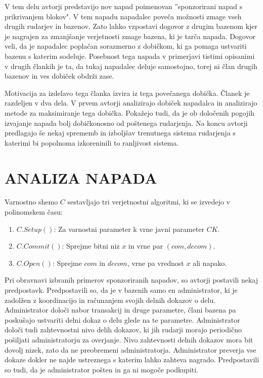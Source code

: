 \documentclass{acm_proc_article-sp}
\begin{document}
V tem delu avtorji predstavijo nov napad poimenovan ''sponzorirani napad s prikrivanjem blokov". V tem napadu napadalec poveča možnosti zmage vseh drugih rudarjev in bazenov. Zato lahko vzpostavi dogovor z drugim bazenom kjer je nagrajen za zmanjšanje verjetnosti zmage bazena, ki je tarča napada. Dogovor veli, da je napadalec poplačan sorazmerno z dobičkom, ki ga pomaga ustvariti bazenu s katerim sodeluje. Posebnost tega napada v primerjavi tistimi opisanimi v drugih člankih je ta, da tukaj napadalec deluje samostojno, torej ni član drugih bazenov in ves dobiček obdrži zase.

Motivacija za izdelavo tega članka izvira iz tega povečanega dobička. Članek je razdeljen v dva dela. V prvem avtorji analizirajo dobiček napadalca in analizirajo metode za maksimiranje tega dobička. Pokažejo tudi, da je ob določenih pogojih izvajanje napada bolj dobičkonosno od poštenega rudarjenja. Na koncu avtorji predlagajo še nekaj sprememb in izboljšav trenutnega sistema rudarjenja s katerimi bi popolnoma izkoreninili to ranljivost sistema.

\vfill\eject

\section{ANALIZA NAPADA}

\newline
\indent Varnostno shemo $C$ sestavljajo tri verjetnostni algoritmi, ki se izvedejo v polinomskem času:
\begin{enumerate}
\item $C.Setup()$: Za varnostni parameter k vrne javni parameter $CK$.
\item $C.Commit()$: Sprejme bitni niz $x$ in vrne par $(com, decom)$.
\item $C.Open()$: Sprejme $com$ in $decom$, vrne pa vrednost $x$ ali napako.
\end{enumerate}

Pri obravnavi izbranih primerov sponzoriranih napadov, so avtorji postavili nekaj predpostavk. Predpostavili so, da je v bazenih samo en administrator, ki je zadolžen z koordinacijo in računanjem svojih delnih dokazov o delu. Administrator določi nabor transakcij in druge parametre, člani bazena pa poskušajo ustvariti  delni dokaz o delu glede na te parametre. Administrator določi tudi zahtevnostni nivo delih dokazov, ki jih rudarji morajo periodično pošiljati administratorju za overjanje. Nivo zahtevnosti delnih dokazov mora bit dovolj nizek, zato da ne preobremeni administratorja. Administrator preverja vse dokaze dokler ne najde ustreznega s katerim lahko zahteva nagrado. Predpostavili so tudi, da je administrator pošten in ga ni mogoče podkupiti.
\end{document}
